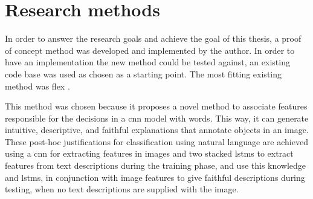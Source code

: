 \label{sec:1_4_research_methods}

\begin{comment}
You are doing a research education, so it might be nice to show that you are aware of different ways of doing research. Here, you should describe your research methods showing the reader that you are conscious of your method. There exist several methodologies, and finding a reference somewhere would probably be good.
\end{comment}

\section{Research methods}

In order to answer the research goals and achieve the goal of this thesis, a proof of concept method was developed and implemented by the author. In order to have an implementation the new method could be tested against, an existing code base was used as chosen as a starting point. The most fitting existing method was \gls{flex} \cite{wickramanayakeFLEXFaithfulLinguistic2019}. 

This method was chosen because it proposes a novel method to associate features responsible for the decisions in a \gls{cnn} model with words. This way, it can generate intuitive, descriptive, and faithful explanations that annotate objects in an image. These post-hoc justifications for classification using natural language are achieved using a \gls{cnn} for extracting features in images and two stacked \glspl{lstm} to extract features from text descriptions during the training phase, and use this knowledge and \glspl{lstm}, in conjunction with image features to give faithful descriptions during testing, when no text descriptions are supplied with the image.

